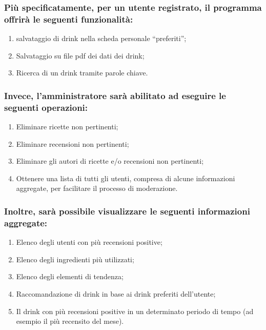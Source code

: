 \documentclass[a4paper,12pt]{report}
\begin{document}
\subsubsection{Più specificatamente, per un utente registrato, il programma offrirà le seguenti funzionalità:}
\begin{enumerate}
    \item salvataggio di drink nella scheda personale “preferiti”;
    \item Salvataggio su file pdf dei dati dei drink;
    \item Ricerca di un drink tramite parole chiave.
\end{enumerate}

\subsubsection{Invece, l'amministratore sarà abilitato ad eseguire le seguenti operazioni:}
\begin{enumerate}
    \item Eliminare ricette non pertinenti;
    \item Eliminare recensioni non pertinenti;
    \item Eliminare gli autori di ricette e/o recensioni non pertinenti;
    \item Ottenere una lista di tutti gli utenti, compresa di alcune informazioni aggregate, per facilitare il processo di moderazione.
\end{enumerate}

\subsubsection{Inoltre, sarà possibile visualizzare le seguenti informazioni aggregate:}
\begin{enumerate}
    \item Elenco degli utenti con più recensioni positive;
    \item Elenco degli ingredienti più utilizzati;
    \item Elenco degli elementi di tendenza;
    \item Raccomandazione di drink in base ai drink preferiti dell’utente;
    \item Il drink con più recensioni positive in un determinato periodo di tempo (ad esempio il più recensito del mese).
\end{enumerate}
\end{document}
